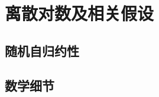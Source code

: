 \section{离散对数及相关假设}\label{sec:10-5}

\begin{game}[离散对数]\label{game:10-4}
	
\end{game}

\begin{definition}[离散对数假设]\label{def:10-6}
	
\end{definition}

\begin{game}\label{game:10-5}
	
\end{game}

\begin{definition}\label{def:10-7}
	
\end{definition}

\begin{game}\label{game:10-6}
	
\end{game}

\begin{definition}\label{def:10-8}
	
\end{definition}

\subsection{随机自归约性}\label{subsec:10-5-1}

\begin{theorem}\label{theo:10-2}
	
\end{theorem}

\subsection{数学细节}\label{subsec:10-5-2}

\begin{definition}[群族]\label{def:10-9}
	
\end{definition}